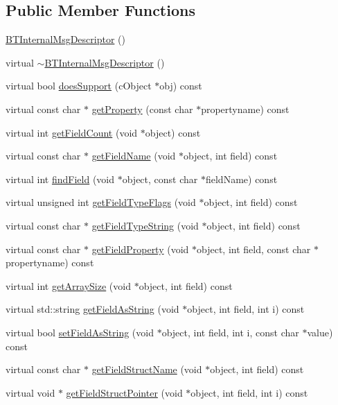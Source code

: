 \subsection*{Public Member Functions}
\begin{DoxyCompactItemize}
\item 
\hyperlink{classBTInternalMsgDescriptor_ab80f6626bd7e6c9ed08f56b7524431b7}{B\+T\+Internal\+Msg\+Descriptor} ()
\item 
virtual \hyperlink{classBTInternalMsgDescriptor_ada07c2205448521107d60449ecccbeba}{$\sim$\+B\+T\+Internal\+Msg\+Descriptor} ()
\item 
virtual bool \hyperlink{classBTInternalMsgDescriptor_acdff02ce9abff61fe3d32c7857e71433}{does\+Support} (c\+Object $\ast$obj) const 
\item 
virtual const char $\ast$ \hyperlink{classBTInternalMsgDescriptor_a46ecca01196b00552c7b992ef015195a}{get\+Property} (const char $\ast$propertyname) const 
\item 
virtual int \hyperlink{classBTInternalMsgDescriptor_a34e1041cfd1bab108cbaa1ffa398d9a1}{get\+Field\+Count} (void $\ast$object) const 
\item 
virtual const char $\ast$ \hyperlink{classBTInternalMsgDescriptor_a7e95cc140d1826c13447b655ca07d468}{get\+Field\+Name} (void $\ast$object, int field) const 
\item 
virtual int \hyperlink{classBTInternalMsgDescriptor_a10949d2641e4383e115fb337ecb29c2a}{find\+Field} (void $\ast$object, const char $\ast$field\+Name) const 
\item 
virtual unsigned int \hyperlink{classBTInternalMsgDescriptor_ad6248569e6541cd769eb4e24d8e84b51}{get\+Field\+Type\+Flags} (void $\ast$object, int field) const 
\item 
virtual const char $\ast$ \hyperlink{classBTInternalMsgDescriptor_a3db0bb17f4f3223e7f676b17e317cc47}{get\+Field\+Type\+String} (void $\ast$object, int field) const 
\item 
virtual const char $\ast$ \hyperlink{classBTInternalMsgDescriptor_a3f6a81e5d8dd6d0ad4c3ecb86e59c42f}{get\+Field\+Property} (void $\ast$object, int field, const char $\ast$propertyname) const 
\item 
virtual int \hyperlink{classBTInternalMsgDescriptor_a2e8260c9d02eceda6c1590f4d552a638}{get\+Array\+Size} (void $\ast$object, int field) const 
\item 
virtual std\+::string \hyperlink{classBTInternalMsgDescriptor_ab8b9906a3147322ab4c0d33556db47ad}{get\+Field\+As\+String} (void $\ast$object, int field, int i) const 
\item 
virtual bool \hyperlink{classBTInternalMsgDescriptor_afaa61cb44223a4144626776093f436a8}{set\+Field\+As\+String} (void $\ast$object, int field, int i, const char $\ast$value) const 
\item 
virtual const char $\ast$ \hyperlink{classBTInternalMsgDescriptor_a634938d55229e78937cd07fcafddcf2b}{get\+Field\+Struct\+Name} (void $\ast$object, int field) const 
\item 
virtual void $\ast$ \hyperlink{classBTInternalMsgDescriptor_ab1d46a660013e3de5ad3c928cb2c801c}{get\+Field\+Struct\+Pointer} (void $\ast$object, int field, int i) const 
\end{DoxyCompactItemize}


